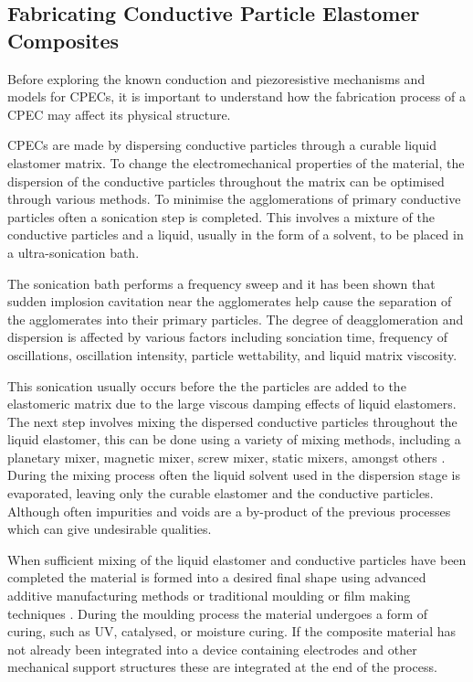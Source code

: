 \subsection{Fabricating Conductive Particle Elastomer Composites}
\label{subsec:Fabricating Conductive Particle Elastomer Composites}
Before exploring the known conduction and piezoresistive mechanisms and models for CPECs, it is important to understand how the fabrication process of a CPEC may affect its physical structure. 

CPECs are made by dispersing conductive particles through a curable liquid elastomer matrix. To change the electromechanical properties of the material, the dispersion of the conductive particles throughout the matrix can be optimised through various methods. To minimise the agglomerations of primary conductive particles often a sonication step is completed. This involves a mixture of the conductive particles and a liquid, usually in the form of a solvent, to be placed in a ultra-sonication bath. 

The sonication bath performs a frequency sweep and it has been shown that sudden implosion cavitation near the agglomerates help cause the separation of the agglomerates into their primary particles\cite{Priyadarshi2021,Kudryashova2019}. The degree of deagglomeration and dispersion is affected by various factors including sonciation time, frequency of oscillations, oscillation intensity, particle wettability, and liquid matrix viscosity\cite{Kudryashova2019,Chen2020a}. 

This sonication usually occurs before the the particles are added to the elastomeric matrix due to the large viscous damping effects of liquid elastomers. The next step involves mixing the dispersed conductive particles throughout the liquid elastomer, this can be done using a variety of mixing methods, including a planetary mixer, magnetic mixer, screw mixer, static mixers, amongst others \cite{Pegel2008,Rosset2016,Fekiri2020,Kim2012}. During the mixing process often the liquid solvent used in the dispersion stage is evaporated, leaving only the curable elastomer and the conductive particles. Although often impurities and voids are a by-product of the previous processes which can give undesirable qualities.

When sufficient mixing of the liquid elastomer and conductive particles have been completed the material is formed into a desired final shape using advanced additive manufacturing methods \cite{Bastola2018,Sapra2023,Krueger2014,Li2020,McCoul2017,Yi2023,Kim2018a} or traditional moulding \cite{Kim2018} or film making techniques \cite{Fasolt2017}. During the moulding process the material undergoes a form of curing, such as UV, catalysed, or moisture curing. If the composite material has not already been integrated into a device containing electrodes and other mechanical support structures these are integrated at the end of the process.


